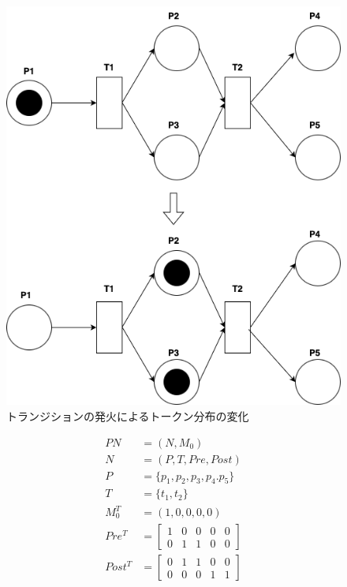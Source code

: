\documentclass[conference]{IEEEtran}
\begin{document}
\begin{figure}[htbp]
\centerline{\includegraphics[scale=0.3]{./fig/fire.pdf}}
\caption{トランジションの発火によるトークン分布の変化}
\label{fig2}
\end{figure}

\begin{align}
PN &= (N,M_0) \\
N &= (P,T,Pre,Post) \\
P &= \{p_1,p_2,p_3,p_4.p_5\} \\
T &= \{t_1,t_2\} \\
M_0^T &= (1,0,0,0,0) \\
Pre^T &=
\begin{bmatrix}
  1 & 0 & 0 & 0 & 0 \\
  0 & 1 & 1 & 0 & 0
\end{bmatrix} \\
Post^T &=
\begin{bmatrix}
  0 & 1 & 1 & 0 & 0 \\
  0 & 0 & 0 & 1 & 1  
\end{bmatrix}
\end{align}
\end{document}
